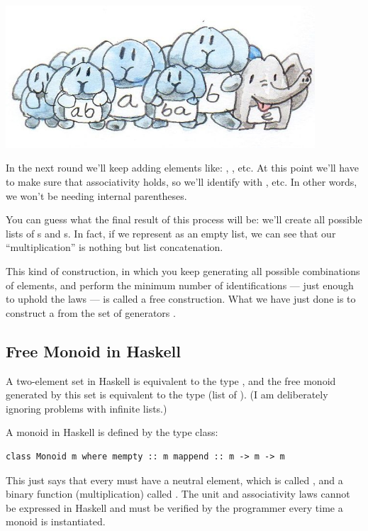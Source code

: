 \includegraphics[width=4.54167in]{images/bunnies.jpg}

In the next round we'll keep adding elements like:
, , etc. At this point we'll
have to make sure that associativity holds, so we'll identify
 with , etc. In other words,
we won't be needing internal parentheses.

You can guess what the final result of this process will be: we'll
create all possible lists of s and s. In fact, if we
represent  as an empty list, we can see that our
``multiplication'' is nothing but list concatenation.

This kind of construction, in which you keep generating all possible
combinations of elements, and perform the minimum number of
identifications --- just enough to uphold the laws --- is called a free
construction. What we have just done is to construct a  from the set of generators .

\subsection{Free Monoid in Haskell}\label{free-monoid-in-haskell}

A two-element set in Haskell is equivalent to the type ,
and the free monoid generated by this set is equivalent to the type
\code{{[}Bool{]}} (list of ). (I am deliberately ignoring
problems with infinite lists.)

A monoid in Haskell is defined by the type class:

\begin{verbatim}
class Monoid m where mempty :: m mappend :: m -> m -> m
\end{verbatim}

This just says that every  must have a neutral element,
which is called , and a binary function (multiplication)
called . The unit and associativity laws cannot be
expressed in Haskell and must be verified by the programmer every time a
monoid is instantiated.


